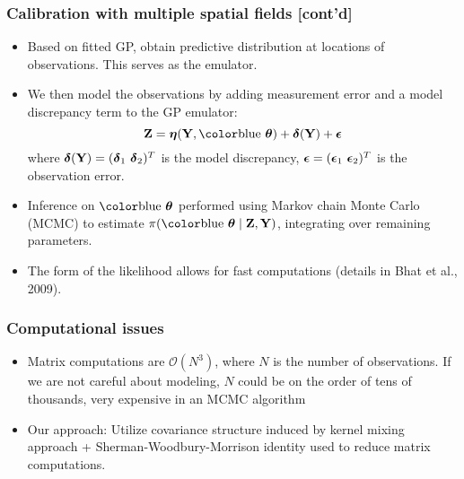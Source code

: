\documentclass{beamer}
\begin{document}
\begin{frame}
  \frametitle{Calibration with multiple spatial fields  [cont'd] }
    \begin{itemize}
    \item Based on fitted GP, obtain predictive distribution at
      locations of observations. This serves as the emulator.
    \item We then model the observations by adding measurement error
      and a model discrepancy term to the GP
      emulator: $$\bZ={\boldeta}(\bY,\bluebtheta) + \bdelta(\bY)+\bepsilon $$ where
     $\mbox{\boldmath $\delta$}({\bf Y})=(\mbox{\boldmath $\delta$}_1~\mbox{\boldmath $\delta$}_2)^T$ is the model discrepancy, $\mbox{\boldmath $\epsilon$}=(\mbox{\boldmath $\epsilon$}_1~\mbox{\boldmath $\epsilon$}_2)^T$ is the observation error.
\item Inference on $\bluebtheta$ performed using Markov chain Monte
  Carlo (MCMC) to estimate $\pi(\bluebtheta\mid \bZ,\bY)$, integrating
  over remaining parameters.
\item The form of the likelihood allows for fast computations (details in Bhat et al., 2009).
 \end{itemize}
\end{frame}

\begin{frame}

\frametitle{Computational issues }
    \begin{itemize}
   \item Matrix computations are $\mathcal{O}(N^3)$, where $N$ is the
     number of observations. If we are not careful about modeling, $N$
     could be on the order of tens of thousands, very expensive in an MCMC algorithm
 \item Our approach: Utilize covariance structure induced by kernel mixing approach + Sherman-Woodbury-Morrison identity used to reduce matrix computations.
      \end{itemize}
\end{frame}
\end{document}
